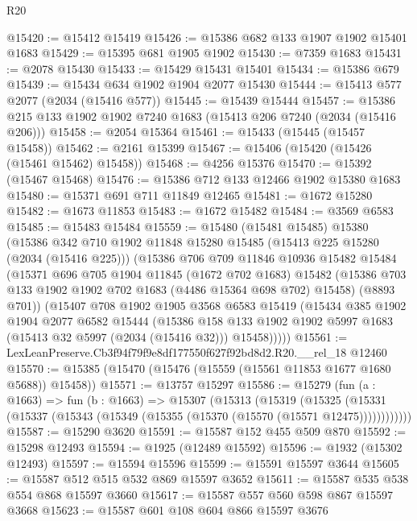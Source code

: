 \begin{lexlean}{R20}
\begin{coremodule}
@15420 := @15412 @15419
@15426 := @15386 @682 @133 @1907 @1902 @15401 @1683
@15429 := @15395 @681 @1905 @1902
@15430 := @7359 @1683
@15431 := @2078 @15430
@15433 := @15429 @15431 @15401
@15434 := @15386 @679
@15439 := @15434 @634 @1902 @1904 @2077 @15430
@15444 := @15413 @577 @2077 (@2034 (@15416 @577))
@15445 := @15439 @15444
@15457 := @15386 @215 @133 @1902 @1902 @7240 @1683 (@15413 @206 @7240 (@2034 (@15416 @206)))
@15458 := @2054 @15364
@15461 := @15433 (@15445 (@15457 @15458))
@15462 := @2161 @15399
@15467 := @15406 (@15420 (@15426 (@15461 @15462) @15458))
@15468 := @4256 @15376
@15470 := @15392 (@15467 @15468)
@15476 := @15386 @712 @133 @12466 @1902 @15380 @1683
@15480 := @15371 @691 @711 @11849 @12465
@15481 := @1672 @15280
@15482 := @1673 @11853
@15483 := @1672 @15482
@15484 := @3569 @6583
@15485 := @15483 @15484
@15559 := @15480
    (@15481 @15485)
    @15380
    (@15386
      @342
      @710
      @1902
      @11848
      @15280
      @15485
      (@15413 @225 @15280 (@2034 (@15416 @225)))
      (@15386
        @706
        @709
        @11846
        @10936
        @15482
        @15484
        (@15371
          @696
          @705
          @1904
          @11845
          (@1672 @702 @1683)
          @15482
          (@15386 @703 @133 @1902 @1902 @702 @1683 (@4486 @15364 @698 @702) @15458)
          (@8893 @701))
        (@15407
          @708
          @1902
          @1905
          @3568
          @6583
          @15419
          (@15434
            @385
            @1902
            @1904
            @2077
            @6582
            @15444
            (@15386
              @158
              @133
              @1902
              @1902
              @5997
              @1683
              (@15413 @32 @5997 (@2034 (@15416 @32)))
              @15458)))))
@15561 := LexLeanPreserve.Cb3f94f79f9e8df177550f627f92bd8d2.R20.__rel_18 @12460
@15570 := @15385 (@15470 (@15476 (@15559 (@15561 @11853 @1677 @1680 @5688)) @15458))
@15571 := @13757 @15297
@15586 := @15279
    (fun (a : @1663) =>
    fun (b : @1663) =>
    @15307
      (@15313
        (@15319
          (@15325 (@15331 (@15337 (@15343 (@15349 (@15355 (@15370 (@15570 (@15571 @12475))))))))))))
@15587 := @15290 @3620
@15591 := @15587 @152 @455 @509 @870
@15592 := @15298 @12493
@15594 := @1925 (@12489 @15592)
@15596 := @1932 (@15302 @12493)
@15597 := @15594 @15596
@15599 := @15591 @15597 @3644
@15605 := @15587 @512 @515 @532 @869 @15597 @3652
@15611 := @15587 @535 @538 @554 @868 @15597 @3660
@15617 := @15587 @557 @560 @598 @867 @15597 @3668
@15623 := @15587 @601 @108 @604 @866 @15597 @3676

\end{coremodule}
\end{lexlean}

